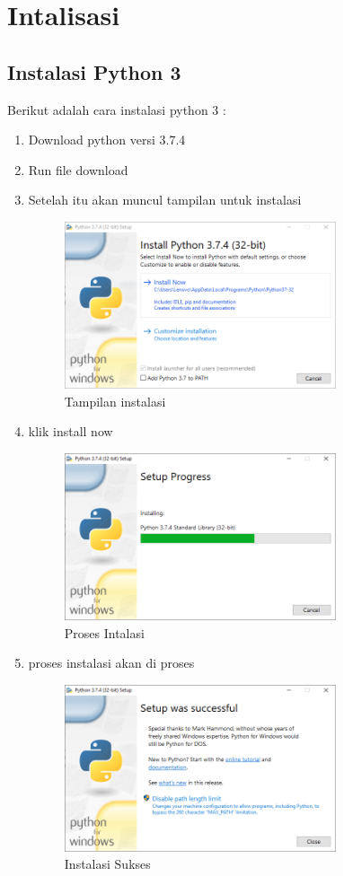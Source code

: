 \chapter{Intalisasi}
	\section{Instalasi Python 3}
	Berikut adalah cara instalasi python 3 :
	\begin{enumerate}
	    \item Download python versi 3.7.4 
	    \item Run file download
	    \item Setelah itu akan muncul tampilan untuk instalasi
	    \par
	    \begin{figure}[!htbp]
	       \centering
		\includegraphics[width=8cm]{figures/1.PNG}
		\caption{Tampilan instalasi}
    	\end{figure}
    	
	    \item klik install now
	    \begin{figure}[!htbp]
	    	\centering
		\includegraphics[width=8cm]{figures/2.PNG}
		\caption{Proses Intalasi}
    	\end{figure}
    	
    	\item proses instalasi akan di proses
	    \begin{figure}[!htbp]
		\centering
		\includegraphics[width=8cm]{figures/3.PNG}
		\caption{Instalasi Sukses}
    	\end{figure}
	\end{enumerate}
	
